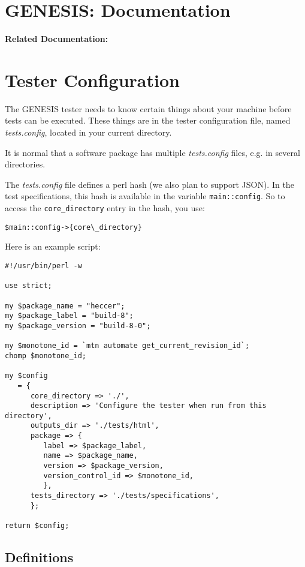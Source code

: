 \documentclass[12pt]{article}
\begin{document}
\section*{GENESIS: Documentation}

{\bf Related Documentation:}

\section*{Tester Configuration}

The GENESIS tester needs to know certain things about your machine before tests can be executed. These things are in the tester configuration file, named {\it tests.config}, located in your current directory.

It is normal that a software package has multiple {\it tests.config} files, e.g. in several directories.

The {\it tests.config} file defines a perl hash (we also plan to support JSON). In the test specifications, this hash is available in the variable {\tt main::config}. So to access the {\tt core\_directory} entry in the hash, you use:
\begin{verbatim}
$main::config->{core\_directory}
\end{verbatim}

Here is an example script:
\begin{verbatim}
#!/usr/bin/perl -w

use strict;

my $package_name = "heccer";
my $package_label = "build-8";
my $package_version = "build-8-0";

my $monotone_id = `mtn automate get_current_revision_id`;
chomp $monotone_id;

my $config
   = {
      core_directory => './',
      description => 'Configure the tester when run from this directory',
      outputs_dir => './tests/html',
      package => {
         label => $package_label,
         name => $package_name,
         version => $package_version,
         version_control_id => $monotone_id,
         },
      tests_directory => './tests/specifications',
      };

return $config;
\end{verbatim}

\subsection*{Definitions}
\end{document}

